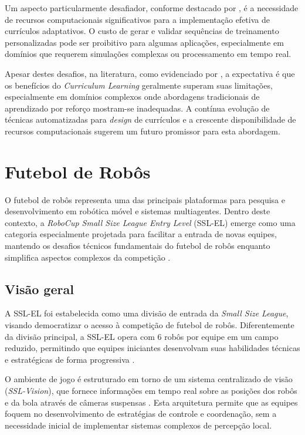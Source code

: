 Um aspecto particularmente desafiador, conforme destacado por \cite{curml}, é a necessidade de recursos computacionais significativos para a implementação efetiva de currículos adaptativos. O custo de gerar e validar sequências de treinamento personalizadas pode ser proibitivo para algumas aplicações, especialmente em domínios que requerem simulações complexas ou processamento em tempo real.

Apesar destes desafios, na literatura, como evidenciado por \cite{curriculum_learning_a_survey}, a expectativa é que os benefícios do \textit{Curriculum Learning} geralmente superam suas limitações, especialmente em domínios complexos onde abordagens tradicionais de aprendizado por reforço mostram-se inadequadas. A contínua evolução de técnicas automatizadas para \textit{design} de currículos e a crescente disponibilidade de recursos computacionais sugerem um futuro promissor para esta abordagem.

\section{Futebol de Robôs}
\label{sec:futebol_robos}

O futebol de robôs representa uma das principais plataformas para pesquisa e desenvolvimento em robótica móvel e sistemas multiagentes. Dentro deste contexto, a \textit{RoboCup Small Size League Entry Level} (SSL-EL) emerge como uma categoria especialmente projetada para facilitar a entrada de novas equipes, mantendo os desafios técnicos fundamentais do futebol de robôs enquanto simplifica aspectos complexos da competição \cite{regras_ssl_el_2024}.

\subsection{Visão geral}
\label{subsec:futebol_visao}

A SSL-EL foi estabelecida como uma divisão de entrada da \textit{Small Size League}, visando democratizar o acesso à competição de futebol de robôs. Diferentemente da divisão principal, a SSL-EL opera com 6 robôs por equipe em um campo reduzido, permitindo que equipes iniciantes desenvolvam suas habilidades técnicas e estratégicas de forma progressiva \cite{regras_ssl_el_2024}.

O ambiente de jogo é estruturado em torno de um sistema centralizado de visão (\textit{SSL-Vision}), que fornece informações em tempo real sobre as posições dos robôs e da bola através de câmeras suspensas \cite{ssl_overview}. Esta arquitetura permite que as equipes foquem no desenvolvimento de estratégias de controle e coordenação, sem a necessidade inicial de implementar sistemas complexos de percepção local.

